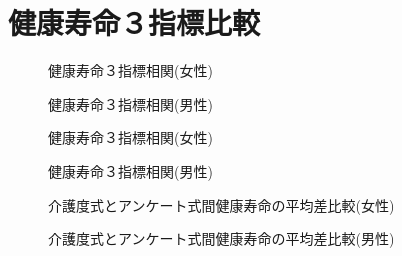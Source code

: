 \section{健康寿命３指標比較}
\begin{figure}[h!]
	\begin{center}
		\caption{健康寿命３指標相関(女性)}
	\end{center}
\end{figure}

\begin{figure}[h!]
	\begin{center}
		\caption{健康寿命３指標相関(男性)}
	\end{center}
\end{figure}



\begin{figure}[h!]
	\begin{center}
		\caption{健康寿命３指標相関(女性)}
	\end{center}
\end{figure}



\begin{figure}[h!]
	\begin{center}
		\caption{健康寿命３指標相関(男性)}
	\end{center}
\end{figure}

\begin{figure}[h!]
	\begin{center}
		\caption{介護度式とアンケート式間健康寿命の平均差比較(女性)}
	\end{center}
\end{figure}

\begin{figure}[h!]
	\begin{center}
		\caption{介護度式とアンケート式間健康寿命の平均差比較(男性)}
	\end{center}
\end{figure}




